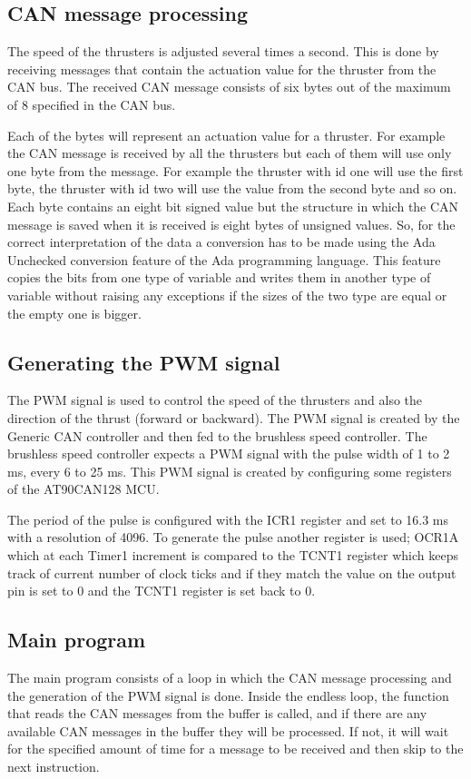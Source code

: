\subsection{CAN message processing}
The speed of the thrusters is adjusted several times a second. This is done by receiving messages that contain the actuation value for the thruster from the CAN bus. The received CAN message consists of six bytes out of the maximum of 8 specified in the CAN bus. 

Each of the bytes will represent an actuation value for a thruster. For example the CAN message is received by all the thrusters but each of them will use only one byte from the message. For example the thruster with id one will use the first byte, the thruster with id two will use the value from the second byte and so on. Each byte contains an eight bit signed value but the structure in which the CAN message is saved when it is received is eight bytes of unsigned values. So, for the correct interpretation of the data a conversion has to be made using the Ada Unchecked conversion feature of the Ada programming language. This feature copies the bits from one type of variable and writes them in another type of variable without raising any exceptions if the sizes of the two type are equal or the empty one is bigger.  
\subsection{Generating the PWM signal}
The PWM signal is used to control the speed of the thrusters and also the direction of the thrust (forward or backward). The PWM signal is created by the Generic CAN controller and then fed to the brushless speed controller. The brushless speed controller expects a PWM signal with the pulse width of 1 to 2 ms, every 6 to 25 ms. This PWM signal is created by configuring some registers of the AT90CAN128 MCU.

 The period of the pulse is configured with the ICR1 register and set to 16.3 ms with a resolution of 4096. To generate the pulse another register is used; OCR1A which at each Timer1 increment is compared to the TCNT1 register which keeps track of current number of clock ticks and if they match the value on the output pin is set to 0 and the TCNT1 register is set back to 0. 

\subsection{Main program}
The main program consists of a loop in which the CAN message processing and the generation of the PWM signal is done. Inside the endless loop, the function that reads the CAN messages from the buffer is called, and if there are any available CAN messages in the buffer they will be processed. If not, it will wait for the specified amount of time for a message to be received and then skip to the next instruction.

 